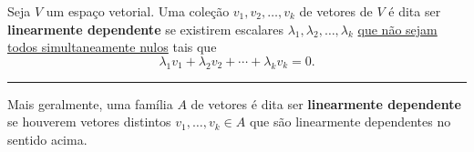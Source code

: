 \begin{definition}
	Seja $V$ um espaço vetorial. Uma coleção $v_1,v_2,\ldots,v_k$ de vetores de $V$ é dita ser \textbf{linearmente dependente} se existirem escalares $\lambda_1,\lambda_2,\ldots,\lambda_k$ \uline{que não sejam todos simultaneamente nulos} tais que
	\[\lambda_1v_1+\lambda_2v_2+\cdots+\lambda_kv_k=0.\]
	
	\hrule
	
	Mais geralmente, uma família $A$ de vetores é dita ser \textbf{linearmente dependente} se houverem vetores distintos $v_1,\ldots,v_k\in A$ que são linearmente dependentes no sentido acima.
\end{definition}